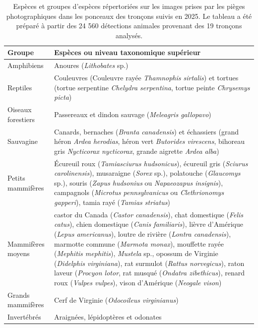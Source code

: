 \begin{table}[H]
  \caption{Espèces et groupes d'espèces répertoriées sur les images prises par les pièges photographiques dans les ponceaux des tronçons suivis en 2025. Le tableau a été préparé à partir des 24 560 détections animales provenant des 19 tronçons analysés.}
  \label{tab:cam-sp-2025}
  \begin{tabular}{p{}p{}}
    \hline
    Groupe & Espèces ou niveau taxonomique supérieur \\
    \hline
    Amphibiens & Anoures (\emph{Lithobates} sp.) \\
    Reptiles & Couleuvres (Couleuvre rayée \emph{Thamnophis sirtalis}) et tortues (tortue serpentine \emph{Chelydra serpentina}, tortue peinte \emph{Chrysemys picta}) \\
    Oiseaux forestiers & Passereaux et dindon sauvage (\emph{Meleagris gallopavo}) \\
    Sauvagine & Canards, bernaches (\emph{Branta canadensis}) et échassiers (grand héron \emph{Ardea herodias}, héron vert \emph{Butorides virescens}, bihoreau gris \emph{Nycticorax nycticorax}, grande aigrette \emph{Ardea alba}) \\
    Petits mammifères & Écureuil roux (\emph{Tamiasciurus hudsonicus}), écureuil gris (\emph{Sciurus carolinensis}), musaraigne (\emph{Sorex} sp.), polatouche (\emph{Glaucomys} sp.), souris (\emph{Zapus hudsonius} ou \emph{Napaeozapus insignis}), campagnols (\emph{Microtus pennsylvanicus} ou \emph{Clethrionomys gapperi}), tamia rayé (\emph{Tamias striatus}) \\
    Mammifères moyens & castor du Canada (\emph{Castor canadensis}), chat domestique (\emph{Felis catus}), chien domestique (\emph{Canis familiaris}), lièvre d’Amérique (\emph{Lepus americanus}), loutre de rivière (\emph{Lontra canadensis}), marmotte commune (\emph{Marmota monax}), mouffette rayée (\emph{Mephitis mephitis}), \emph{Mustela} sp., opossum de Virginie (\emph{Didelphis virginiana}), rat surmulot (\emph{Rattus norvegicus}), raton laveur (\emph{Procyon lotor}, rat musqué (\emph{Ondatra zibethicus}), renard roux (\emph{Vulpes vulpes}), vison d'Amérique (\emph{Neogale vison}) \\
    Grands mammifères & Cerf de Virginie (\emph{Odocoileus virginianus}) \\
    Invertébrés & Araignées, lépidoptères et odonates \\
   \hline
  \end{tabular}
\end{table}


